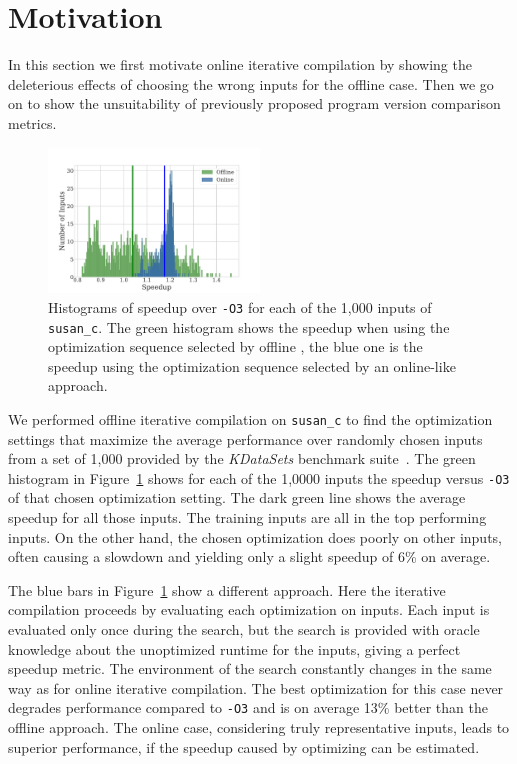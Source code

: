 \section{Motivation}

    In this section we first motivate online iterative compilation by showing the deleterious effects of choosing the wrong inputs for the
    offline case. Then we go on to show the unsuitability of previously proposed program version comparison metrics.

    \begin{figure}[t!]
        \centering
        \includegraphics[width=0.5\textwidth]{figs/motivation-online.pdf}
        \caption{
            Histograms of speedup over \texttt{-O3} for each of the 1,000 inputs of \texttt{susan\_c}. The green histogram shows the
            speedup when using the optimization sequence selected by offline \itercomp, the blue one is the speedup using the optimization
            sequence selected by an online-like approach. 
        }
        \label{fig:motivation-online}
    \end{figure}

    We performed offline iterative compilation on \texttt{susan\_c} to find the optimization settings that maximize the average performance
    over  randomly chosen inputs from a set of 1,000 provided by the \textit{KDataSets} benchmark suite~\cite{chen10,chen12a}.
    The green histogram in Figure~\ref{fig:motivation-online} shows for each of the 1,0000 inputs the speedup versus \texttt{-O3} of that
    chosen optimization setting. The dark green line shows the average speedup for all those inputs. The  training inputs are
    all in the top  performing inputs. On the other hand, the chosen optimization does poorly on other inputs, often causing
    a slowdown and yielding only a slight speedup of 6\% on average.
    
    The blue bars in Figure~\ref{fig:motivation-online} show a different approach. Here the iterative compilation proceeds by evaluating
    each optimization on  inputs. Each input is evaluated only once during the search, but the search is provided with oracle
    knowledge about the unoptimized runtime for the inputs, giving a perfect speedup metric. The environment of the search constantly
    changes in the same way as for online iterative compilation. The best optimization for this case never degrades performance compared to
    \texttt{-O3} and is on average 13\% better than the offline approach. The online case, considering truly representative inputs, leads
    to superior performance, if the speedup caused by optimizing can be estimated.

